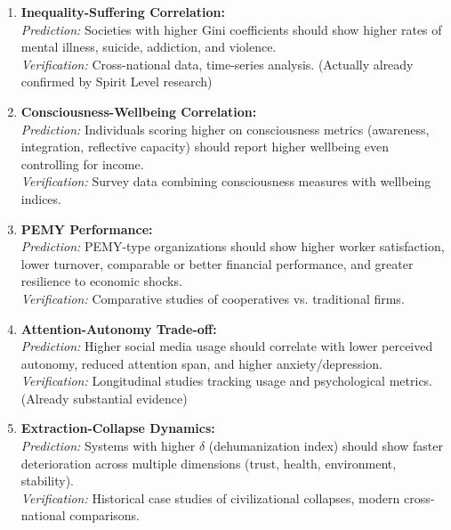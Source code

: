 \documentclass[11pt,a4paper]{article}
\theoremstyle{definition}
\theoremstyle{remark}
\begin{document}
\begin{enumerate}
    \item \textbf{Inequality-Suffering Correlation:}
    \\
    \textit{Prediction:} Societies with higher Gini coefficients should show higher rates of mental illness, suicide, addiction, and violence.
    \\
    \textit{Verification:} Cross-national data, time-series analysis. (Actually already confirmed by Spirit Level research)
    
    \item \textbf{Consciousness-Wellbeing Correlation:}
    \\
    \textit{Prediction:} Individuals scoring higher on consciousness metrics (awareness, integration, reflective capacity) should report higher wellbeing even controlling for income.
    \\
    \textit{Verification:} Survey data combining consciousness measures with wellbeing indices.
    
    \item \textbf{PEMY Performance:}
    \\
    \textit{Prediction:} PEMY-type organizations should show higher worker satisfaction, lower turnover, comparable or better financial performance, and greater resilience to economic shocks.
    \\
    \textit{Verification:} Comparative studies of cooperatives vs. traditional firms.
    
    \item \textbf{Attention-Autonomy Trade-off:}
    \\
    \textit{Prediction:} Higher social media usage should correlate with lower perceived autonomy, reduced attention span, and higher anxiety/depression.
    \\
    \textit{Verification:} Longitudinal studies tracking usage and psychological metrics. (Already substantial evidence)
    
    \item \textbf{Extraction-Collapse Dynamics:}
    \\
    \textit{Prediction:} Systems with higher $\delta$ (dehumanization index) should show faster deterioration across multiple dimensions (trust, health, environment, stability).
    \\
    \textit{Verification:} Historical case studies of civilizational collapses, modern cross-national comparisons.
\end{enumerate}
\end{document}
